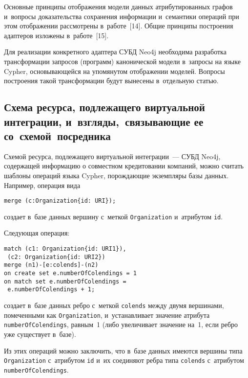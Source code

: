 \begin{multicols}{2}
      Основные принципы отображения модели данных атрибутированных 
графов и~вопросы доказательства сохранения информации и~семантики\linebreak 
операций при этом отображении рассмотрены в~работе~[14]. Общие принципы 
построения адаптеров изложены в~работе~[15].
      
      Для реализации конкретного адаптера СУБД Neo4j необходима 
разработка трансформации запросов (программ) канонической модели 
в~запросы на языке Cypher, основывающейся на упомянутом отображении 
моделей. Вопросы построения такой трансформации будут вынесены 
в~отдельную \mbox{статью}. 
      
\subsection{Схема ресурса, подлежащего виртуальной интеграции, 
и~взгляды,~связывающие ее со~схемой~посредника}

      Схемой ресурса, подлежащего виртуальной интеграции~--- 
СУБД Neo4j, содержащей информацию о совместном кредитовании компаний, 
можно считать шаблоны операций языка Cypher, порожда\-ющие экземпляры 
базы данных. Например, операция вида
      \begin{verbatim}
merge (c:Organization{id: URI});
\end{verbatim}

\noindent
создает в~базе данных вершину с~меткой \verb"Organization" и~атрибутом 
\verb"id".

      Следующая операция:
      {\small
      \begin{verbatim}
match (c1: Organization{id: URI1}),
 (c2: Organization{id: URI2})
merge (n1)-[e:colends]-(n2)
on create set e.numberOfColendings = 1
on match set e.numberOfColendings = 
 e.numberOfColendings + 1;
\end{verbatim}
}

\noindent
создает в~базе данных ребро с~меткой \verb"colends" между двумя вершинами, 
помеченными как \verb"Organization", и~устанавливает значение атрибута 
\verb"numberOfColendings", равным~1 (либо увеличивает значение на~1, если 
ребро уже существует в~базе).

      Из этих операций можно заключить, что в~базе данных имеются 
вершины типа \verb"Organization" с~атрибутом \verb"id" и~их соединяют ребра 
типа \verb"colends" с~атрибутом \verb"numberOfColendings".
      

\end{multicols}
